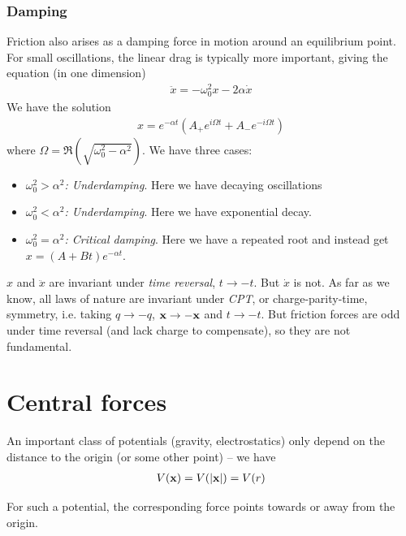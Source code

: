 \documentclass{../../template/note}
\begin{document}
    \subsubsection{Damping}

    Friction also arises as a damping force in motion around an equilibrium point. For small oscillations, the linear drag is typically more important, giving the equation (in one dimension)
    \begin{align*}
        \ddot x = -\omega_0^2 x - 2\alpha \dot x
    \end{align*}
    We have the solution
    \begin{align*}
        x = e^{-\alpha t}\left(A_+ e^{i\Omega t} + A_- e^{-i\Omega t}\right)
    \end{align*}
    where \(\Omega = \Re\left(\sqrt{\omega_0^2-\alpha^2}\right)\). We have three cases:
    \begin{itemize}
        \item \emph{\(\omega_0^2 > \alpha^2\): Underdamping}. Here we have decaying oscillations
        \item \emph{\(\omega_0^2 < \alpha^2\): Underdamping}. Here we have exponential decay.
        \item \emph{\(\omega_0^2 = \alpha^2\): Critical damping}. Here we have a repeated root and instead get \(x = (A + Bt)e^{-\alpha t}\).
    \end{itemize}
    
    \begin{remark*}
        \(x\) and \(\ddot x\) are invariant under \emph{time reversal}, \(t \to -t\). But \(\dot x\) is not. As far as we know, all laws of nature are invariant under \emph{CPT}, or charge-parity-time, symmetry, i.e. taking \(q \to -q\), \(\V x \to -\V x\) and \(t \to -t\). But friction forces are odd under time reversal (and lack charge to compensate), so they are not fundamental.
    \end{remark*}
    
    \section{Central forces}

    An important class of potentials (gravity, electrostatics) only depend on the distance to the origin (or some other point) -- we have
    \begin{align*}
        V(\V x) = V(|\V x|) = V(r)
    \end{align*}
    \begin{proposition}
        For such a potential, the corresponding force points towards or away from the origin.
        \label{central-forces}
    \end{proposition}
    
\end{document}
